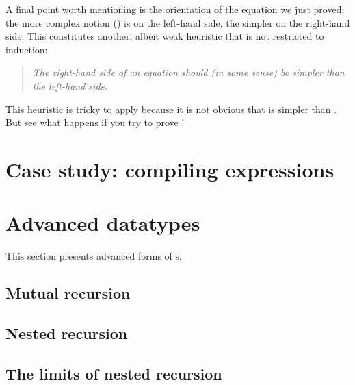 {\makeatother}

A final point worth mentioning is the orientation of the equation we just
proved: the more complex notion () is on the left-hand
side, the simpler  on the right-hand side. This constitutes
another, albeit weak heuristic that is not restricted to induction:
\begin{quote}
  \emph{The right-hand side of an equation should (in some sense) be simpler
    than the left-hand side.}
\end{quote}
This heuristic is tricky to apply because it is not obvious that
 is simpler than . But see what
happens if you try to prove !

\begin{exercise}
%
\end{exercise}

\section{Case study: compiling expressions}
\label{sec:ExprCompiler}

{\makeatother}


\section{Advanced datatypes}
\label{sec:advanced-datatypes}

This section presents advanced forms of s.

\subsection{Mutual recursion}
\label{sec:datatype-mut-rec}



\subsection{Nested recursion}
\label{sec:nested-datatype}

{\makeatother}


\subsection{The limits of nested recursion}

